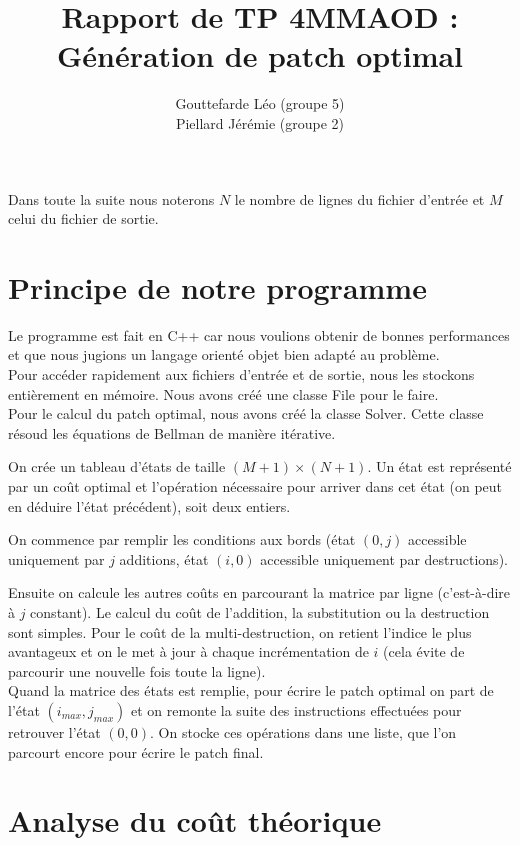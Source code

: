 \documentclass[a4paper, 10pt, french]{article}
\title{Rapport de TP 4MMAOD : Génération de patch optimal}
\author{
{\sc Gouttefarde} Léo (groupe 5)\\
{\sc Piellard} Jérémie (groupe 2)
}
\begin{document}
\maketitle

Dans toute la suite nous noterons $N$ le nombre de lignes du fichier d'entrée et $M$ celui du fichier de sortie.

\section{Principe de notre  programme}
Le programme est fait en C++ car nous voulions obtenir de bonnes performances
et que nous jugions un langage orienté objet bien adapté au problème.\\

Pour accéder rapidement aux fichiers d'entrée et de sortie, nous les stockons entièrement en mémoire.
Nous avons créé une classe File pour le faire.\\

Pour le calcul du patch optimal, nous avons créé la classe Solver.
Cette classe résoud les équations de Bellman de manière itérative.

On crée un tableau d'états de taille $(M+1)\times(N+1)$.
Un état est représenté par un coût optimal et l'opération nécessaire pour arriver dans cet état
(on peut en déduire l'état précédent), soit deux entiers.

On commence par remplir les conditions aux bords
(état $(0,j)$ accessible uniquement par $j$ additions,
état $(i,0)$ accessible uniquement par destructions).

Ensuite on calcule les autres coûts en parcourant la matrice par ligne
(c'est-à-dire à $j$ constant).
Le calcul du coût de l'addition, la substitution ou la destruction sont simples.
Pour le coût de la multi-destruction, on retient l'indice le plus avantageux
et on le met à jour à chaque incrémentation de $i$ (cela évite de parcourir une nouvelle fois toute la ligne).\\

Quand la matrice des états est remplie, pour écrire le patch optimal on part de l'état $(i_{max}, j_{max})$
et on remonte la suite des instructions effectuées pour retrouver l'état $(0,0)$.
On stocke ces opérations dans une liste, que l'on parcourt encore pour écrire le patch final.

\section{Analyse du coût théorique}
\end{document}
